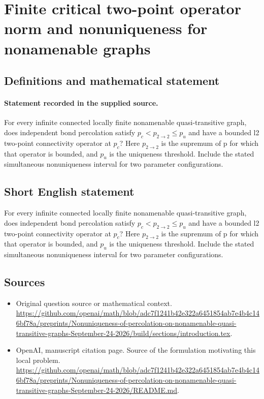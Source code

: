 \documentclass[11pt]{article}
\begin{document}
\section*{Finite critical two-point operator norm and nonuniqueness for nonamenable graphs}\label{statement}
\subsection{Definitions and mathematical statement}
\paragraph{Statement recorded in the supplied source.}
For every infinite connected locally finite nonamenable quasi-transitive graph, does independent bond percolation satisfy $p_c<p_{2\to 2}\leq p_u$ and have a bounded l2 two-point connectivity operator at $p_c$? Here $p_{2\to 2}$ is the supremum of p for which that operator is bounded, and $p_u$ is the uniqueness threshold. Include the stated simultaneous nonuniqueness interval for two parameter configurations.
\subsection{Short English statement}
For every infinite connected locally finite nonamenable quasi-transitive graph, does independent bond percolation satisfy $p_c<p_{2\to 2}\leq p_u$ and have a bounded l2 two-point connectivity operator at $p_c$? Here $p_{2\to 2}$ is the supremum of p for which that operator is bounded, and $p_u$ is the uniqueness threshold. Include the stated simultaneous nonuniqueness interval for two parameter configurations.
\subsection{Sources}
\begin{itemize}
\item[S1] Original question source or mathematical context.
\url{https://github.com/openai/math/blob/adc7f1241b42e322a6451854ab7e4b4c146bf78a/preprints/Nonuniqueness-of-percolation-on-nonamenable-quasi-transitive-graphs-September-24-2026/build/sections/introduction.tex}.
\item[S2] OpenAI, manuscript citation page. Source of the formulation motivating this local problem.
\url{https://github.com/openai/math/blob/adc7f1241b42e322a6451854ab7e4b4c146bf78a/preprints/Nonuniqueness-of-percolation-on-nonamenable-quasi-transitive-graphs-September-24-2026/README.md}.
\end{itemize}
\end{document}
